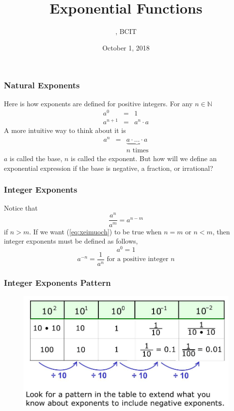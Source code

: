 \documentclass[xcolor=dvipsnames]{beamer}
\title{Exponential Functions}
\subtitle{{\CourseNumber}, BCIT}
\author{\CourseName}
\date{October 1, 2018}
\begin{document}
\begin{frame}
  \titlepage
\end{frame}

\begin{frame}
  \frametitle{Natural Exponents}
  Here is how exponents are defined for positive integers. For any $n\in\mathbb{N}$
  \begin{equation}
    \label{eq:kuliekar}
    \begin{array}{rcl}
      a^{0}&=&1 \\
      a^{n+1}&=&a^{n}\cdot{}a
    \end{array}
  \end{equation}
A more intuitive way to think about it is
\begin{equation}
  \label{eq:ogheenoo}
  \begin{array}{rcl}
    a^{n}&=&\underbrace{a\cdot\ldots\cdot{}a} \\
         &&n\mbox{ times}
  \end{array}
\end{equation}
$a$ is called the \alert{base}, $n$ is called the \alert{exponent}.
But how will we define an exponential expression if the base is
negative, a fraction, or irrational?
\end{frame}

\begin{frame}
  \frametitle{Integer Exponents}
Notice that
\begin{equation}
  \label{eq:xeimuoch}
  \frac{a^{n}}{a^{m}}=a^{n-m}
\end{equation}
if $n>m$. If we want (\ref{eq:xeimuoch}) to be true when $n=m$ or
$n<m$, then integer exponents must be defined as follows,
\begin{equation}
  \label{eq:raishaep}
  a^{0}=1
\end{equation}
\begin{equation}
  \label{eq:pahcahka}
  a^{-n}=\frac{1}{a^{n}}\mbox{ for a positive integer }n
\end{equation}
\end{frame}

\begin{frame}
  \frametitle{Integer Exponents Pattern}
  \begin{figure}[h]
    \includegraphics[scale=.4]{./IntegerExponentsPattern.png}
  \end{figure}
\end{frame}
\end{document}
